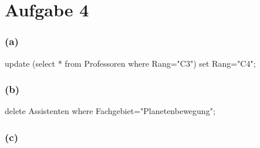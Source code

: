 \documentclass{article}
\begin{document}
\section*{Aufgabe 4}

\subsubsection*{(a)}

update (select * from Professoren where Rang="C3") set Rang="C4";

\subsubsection*{(b)}

delete Assistenten where Fachgebiet="Planetenbewegung";

\subsubsection*{(c)}
\end{document}
